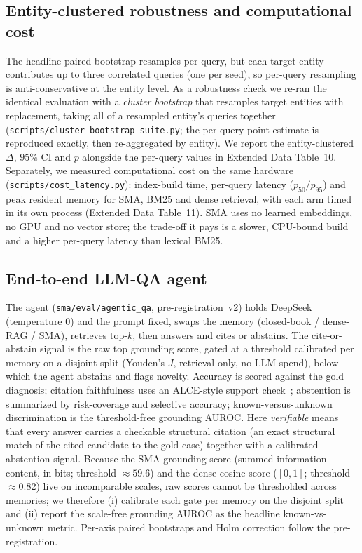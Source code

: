 \documentclass[pdflatex,sn-nature]{sn-jnl}
\begin{document}
\subsection{Entity-clustered robustness and computational cost}
The headline paired bootstrap resamples per query, but each target entity
contributes up to three correlated queries (one per seed), so per-query resampling
is anti-conservative at the entity level. As a robustness check we re-ran the
identical evaluation with a \emph{cluster bootstrap} that resamples target entities
with replacement, taking all of a resampled entity's queries together
(\texttt{scripts/cluster\_bootstrap\_suite.py}; the per-query point estimate is
reproduced exactly, then re-aggregated by entity). We report the entity-clustered
$\Delta$, $95\%$ CI and $p$ alongside the per-query values in Extended Data
Table~10. Separately, we measured computational cost on the same hardware
(\texttt{scripts/cost\_latency.py}): index-build time, per-query latency
($p_{50}/p_{95}$) and peak resident memory for SMA, BM25 and dense retrieval, with
each arm timed in its own process (Extended Data Table~11). SMA uses no learned
embeddings, no GPU and no vector store; the trade-off it pays is a slower,
CPU-bound build and a higher per-query latency than lexical BM25.

\subsection{End-to-end LLM-QA agent}
 The agent (\texttt{sma/eval/agentic\_qa},
pre-registration~v2) holds DeepSeek (temperature $0$) and the prompt fixed, swaps
the memory (closed-book / dense-RAG / SMA), retrieves top-$k$, then answers and
cites or abstains. The cite-or-abstain signal is the raw top grounding score,
gated at a threshold calibrated per memory on a disjoint split (Youden's $J$,
retrieval-only, no LLM spend), below which the agent abstains and flags novelty.
Accuracy is scored against the gold diagnosis; citation faithfulness uses an
ALCE-style support check~\cite{gao2023alce}; abstention is summarized by
risk-coverage and selective accuracy; known-versus-unknown discrimination is the
threshold-free grounding AUROC. Here \emph{verifiable} means that every answer
carries a checkable structural citation (an exact structural match of the cited
candidate to the gold case) together with a calibrated abstention signal. Because
the SMA grounding score (summed information content, in bits; threshold
$\approx 59.6$) and the dense cosine score ($[0,1]$; threshold $\approx 0.82$)
live on incomparable scales, raw scores cannot be thresholded across memories; we
therefore (i) calibrate each gate per memory on the disjoint split and (ii) report
the scale-free grounding AUROC as the headline known-vs-unknown metric. Per-axis
paired bootstraps and Holm correction follow the pre-registration.
\end{document}
